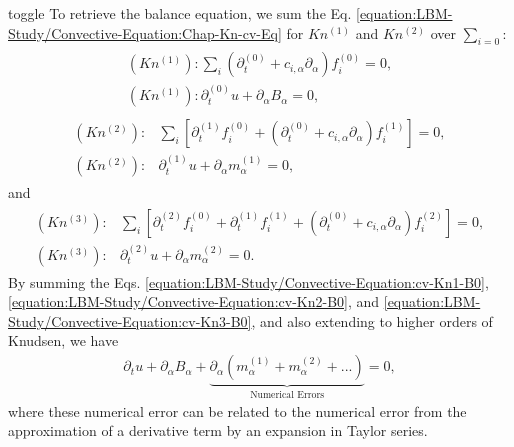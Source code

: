 \documentclass[letterpaper,10pt,english,openany,oneside]{jupyterBook}
\begin{document}
\begin{sphinxuseclass}{toggle}
\sphinxAtStartPar
To retrieve the balance equation, we sum the Eq. \eqref{equation:LBM-Study/Convective-Equation:Chap-Kn-cv-Eq} for \(Kn^{(1)}\) and \(Kn^{(2)}\) over \(\sum_{i=0} \):
\begin{equation}\label{equation:LBM-Study/Convective-Equation:cv-Kn1-B0}
\begin{split}
\begin{array}{l}
(Kn^{(1)}): \displaystyle\sum_{i}\left( \partial_{t}^{(0)} + c_{i,\alpha}\partial_{\alpha} \right)f_{i}^{(0)}= 0,\\
(Kn^{(1)}): \partial_{t}^{(0)}  u + \partial_{\alpha} B_{\alpha} =0,
\end{array}
\end{split}
\end{equation}\begin{equation}\label{equation:LBM-Study/Convective-Equation:cv-Kn2-B0}
\begin{split}
\begin{array}{ll}
(Kn^{(2)}):& \displaystyle\sum_{i}\left[ \partial_{t}^{(1)} f_{i}^{(0)} + \left( \partial_{t}^{(0)} + c_{i,\alpha}\partial_{\alpha} \right) f_{i}^{(1)}   \right]=  0, \\
(Kn^{(2)}):& \partial_{t}^{(1)} u + \partial_{\alpha} m^{(1)}_{\alpha} = 0,
\end{array}
\end{split}
\end{equation}
\sphinxAtStartPar
and
\begin{equation}\label{equation:LBM-Study/Convective-Equation:cv-Kn3-B0}
\begin{split}
\begin{array}{ll}
(Kn^{(3)}):& \displaystyle\sum_{i}\left[ \partial_{t}^{(2)} f_{i}^{(0)} +\partial_{t}^{(1)} f_{i}^{(1)} + \left( \partial_{t}^{(0)} + c_{i,\alpha}\partial_{\alpha} \right)f_{i}^{(2)}   \right]=  0, \\
(Kn^{(3)}):& \partial_{t}^{(2)} u + \partial_{\alpha} m^{(2)}_{\alpha} = 0.
\end{array}
\end{split}
\end{equation}
\sphinxAtStartPar
By summing the Eqs. \eqref{equation:LBM-Study/Convective-Equation:cv-Kn1-B0}, \eqref{equation:LBM-Study/Convective-Equation:cv-Kn2-B0}, and \eqref{equation:LBM-Study/Convective-Equation:cv-Kn3-B0}, and also extending to higher orders of Knudsen, we have
\begin{equation*}
\begin{split}
\partial_{t}  u + \partial_{\alpha} B_{\alpha} + \underbrace{\partial_{\alpha} \left( m^{(1)}_{\alpha} + m^{(2)}_{\alpha} + ...\right) }_{\textrm{Numerical Errors}} =0,
\end{split}
\end{equation*}
\sphinxAtStartPar
where these numerical error can be related to the numerical error from the approximation of a derivative term by an expansion in Taylor series.

\end{sphinxuseclass}
\end{document}
